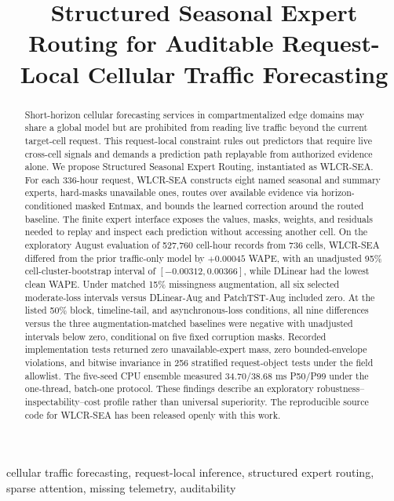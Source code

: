 \documentclass[10pt,conference,letterpaper]{IEEEtran}
\title{Structured Seasonal Expert Routing for Auditable Request-Local Cellular Traffic Forecasting}
\author{\IEEEauthorblockN{Anonymous Author(s)}
\IEEEauthorblockA{Anonymous institution\\Anonymous email}}
\begin{document}
\maketitle

\begin{abstract}
Short-horizon cellular forecasting services in compartmentalized edge domains may share a global model but are prohibited from reading live traffic beyond the current target-cell request. This request-local constraint rules out predictors that require live cross-cell signals and demands a prediction path replayable from authorized evidence alone. We propose Structured Seasonal Expert Routing, instantiated as WLCR-SEA. For each 336-hour request, WLCR-SEA constructs eight named seasonal and summary experts, hard-masks unavailable ones, routes over available evidence via horizon-conditioned masked Entmax, and bounds the learned correction around the routed baseline. The finite expert interface exposes the values, masks, weights, and residuals needed to replay and inspect each prediction without accessing another cell.
On the exploratory August evaluation of 527,760 cell-hour records from 736 cells, WLCR-SEA differed from the prior traffic-only model by $+0.00045$ WAPE, with an unadjusted 95\% cell-cluster-bootstrap interval of $[-0.00312,0.00366]$, while DLinear had the lowest clean WAPE. Under matched 15\% missingness augmentation, all six selected moderate-loss intervals versus DLinear-Aug and PatchTST-Aug included zero. At the listed 50\% block, timeline-tail, and asynchronous-loss conditions, all nine differences versus the three augmentation-matched baselines were negative with unadjusted intervals below zero, conditional on five fixed corruption masks. Recorded implementation tests returned zero unavailable-expert mass, zero bounded-envelope violations, and bitwise invariance in 256 stratified request-object tests under the field allowlist. The five-seed CPU ensemble measured 34.70/38.68 ms P50/P99 under the one-thread, batch-one protocol. These findings describe an exploratory robustness--inspectability--cost profile rather than universal superiority.
The reproducible source code for WLCR-SEA has been released openly with this work.
\end{abstract}

\begin{IEEEkeywords}
cellular traffic forecasting, request-local inference, structured expert routing, sparse attention, missing telemetry, auditability
\end{IEEEkeywords}
\end{document}
